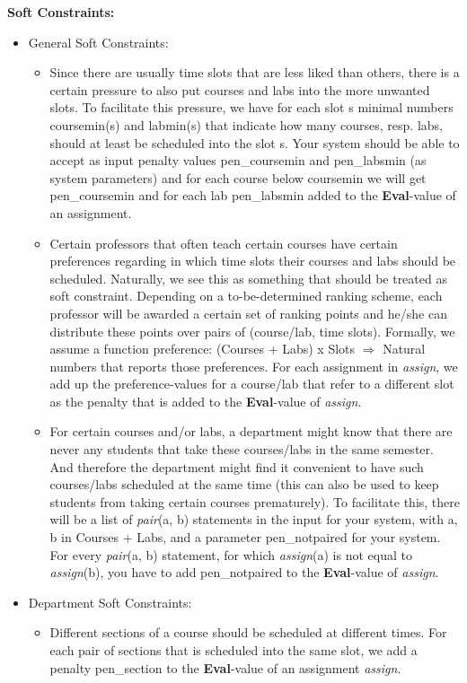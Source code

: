 \documentclass[10pt, oneside]{article}   	%
\begin{document}
\noindent \textbf{Soft Constraints:}
\begin{itemize}[topsep=0pt, itemsep=0pt]
\item General Soft Constraints:
    \begin{itemize}[topsep=0pt, itemsep=0pt]
    \item Since there are usually time slots that are less liked than others, there is a certain pressure to also put courses and labs into the more unwanted slots. To facilitate this pressure, we have for each slot s minimal numbers coursemin(s) and labmin(s) that indicate how many courses, resp. labs, should at least be scheduled into the slot s. Your system should be able to accept as input penalty values pen_coursemin and pen_labsmin (as system parameters) and for each course below coursemin we will get pen_coursemin and for each lab pen_labsmin added to the \textbf{Eval}-value of an assignment.
    \item Certain professors that often teach certain courses have certain preferences regarding in which time slots their courses and labs should be scheduled. Naturally, we see this as something that should be treated as soft constraint. Depending on a to-be-determined ranking scheme, each professor will be awarded a certain set of ranking points and he/she can distribute these points over pairs of (course/lab, time slots). Formally, we assume a function preference: (Courses + Labs) x Slots $\Rightarrow$ Natural numbers that reports those preferences. For each assignment in \textit{assign}, we add up the preference-values for a course/lab that refer to a different slot as the penalty that is added to the \textbf{Eval}-value of \textit{assign}.
    \item For certain courses and/or labs, a department might know that there are never any students that take these courses/labs in the same semester. And therefore the department might find it convenient to have such courses/labs scheduled at the same time (this can also be used to keep students from taking certain courses prematurely). To facilitate this, there will be a list of \textit{pair}(a, b) statements in the input for your system, with a, b in Courses + Labs, and a parameter pen_notpaired for your system. For every \textit{pair}(a, b) statement, for which \textit{assign}(a) is not equal to \textit{assign}(b), you have to add pen_notpaired to the \textbf{Eval}-value of \textit{assign}.
    \end{itemize}
\item Department Soft Constraints:
    \begin{itemize}[topsep=0pt, itemsep=0pt]
    \item Different sections of a course should be scheduled at different times. For each pair of sections that is scheduled into the same slot, we add a penalty pen\_section to the \textbf{Eval}-value of an assignment \textit{assign}.
    \end{itemize}
\end{itemize}
\break
\end{document}

